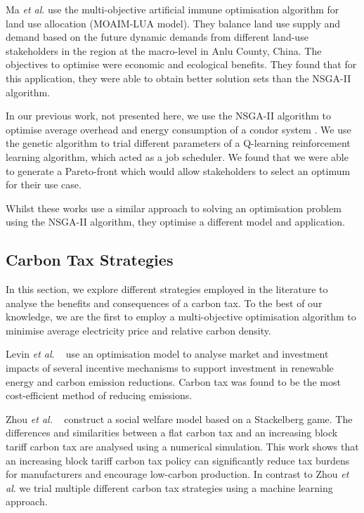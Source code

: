 Ma \textit{et al}. \cite{Ma2015} use the multi-objective artificial immune optimisation algorithm for land use allocation (MOAIM-LUA model). They balance land use supply and demand based on the future dynamic demands from different land-use stakeholders in the region at the macro-level in Anlu County, China. The objectives to optimise were economic and ecological benefits. They found that for this application, they were able to obtain better solution sets than the NSGA-II algorithm.

In our previous work, not presented here, we use the NSGA-II algorithm to optimise average overhead and energy consumption of a condor system \cite{Kell2019}. We use the genetic algorithm to trial different parameters of a Q-learning reinforcement learning algorithm, which acted as a job scheduler. We found that we were able to generate a Pareto-front  which would allow stakeholders to select an optimum for their use case. 

Whilst these works use a similar approach to solving an optimisation problem using the NSGA-II algorithm, they optimise a different model and application. 

\subsection{Carbon Tax Strategies}

In this section, we explore different strategies employed in the literature to analyse the benefits and consequences of a carbon tax. To the best of our knowledge, we are the first to employ a multi-objective optimisation algorithm to minimise average electricity price and relative carbon density.

Levin \textit{et al}. ~\cite{Levin2019} use an optimisation model to analyse market and investment impacts of several incentive mechanisms to support investment in renewable energy and carbon emission reductions. Carbon tax was found to be the most cost-efficient method of reducing emissions. 

Zhou \textit{et al.} ~\cite{Zhou2019} construct a social welfare model based on a Stackelberg game. The differences and similarities between a flat carbon tax and an increasing block tariff carbon tax are analysed using a numerical simulation. This work shows that an increasing block tariff carbon tax policy can significantly reduce tax burdens for manufacturers and encourage low-carbon production. In contrast to Zhou \textit{et al}. we trial multiple different carbon tax strategies using a machine learning approach. 

